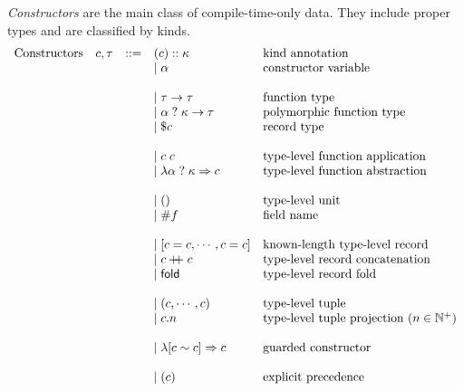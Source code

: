 \documentclass{article}
\newcommand{\mt}[1]{\mathsf{#1}}
\newcommand{\rc}{+ \hspace{-.075in} + \;}
\begin{document}
\emph{Constructors} are the main class of compile-time-only data.  They include proper types and are classified by kinds.
$$\begin{array}{rrcll}
  \textrm{Constructors} & c, \tau &::=& (c) :: \kappa & \textrm{kind annotation} \\
  &&& \mid \alpha & \textrm{constructor variable} \\
  \\
  &&& \mid \tau \to \tau & \textrm{function type} \\
  &&& \mid \alpha \; ? \; \kappa \to \tau & \textrm{polymorphic function type} \\
  &&& \mid \$ c & \textrm{record type} \\
  \\
  &&& \mid c \; c & \textrm{type-level function application} \\
  &&& \mid \lambda \alpha \; ? \; \kappa \Rightarrow c & \textrm{type-level function abstraction} \\
  \\
  &&& \mid () & \textrm{type-level unit} \\
  &&& \mid \#f & \textrm{field name} \\
  \\
  &&& \mid [c = c, \cdots, c = c] & \textrm{known-length type-level record} \\
  &&& \mid c \rc c & \textrm{type-level record concatenation} \\
  &&& \mid \mt{fold} & \textrm{type-level record fold} \\
  \\
  &&& \mid (c, \cdots, c) & \textrm{type-level tuple} \\
  &&& \mid c.n & \textrm{type-level tuple projection ($n \in \mathbb N^+$)} \\
  \\
  &&& \mid \lambda [c \sim c] \Rightarrow c & \textrm{guarded constructor} \\
  \\
  &&& \mid (c) & \textrm{explicit precedence} \\
\end{array}$$
\end{document}

